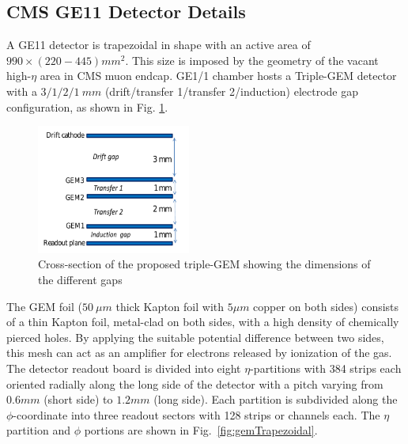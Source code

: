 \subsection{CMS GE11 Detector Details} %
\label{sub:ge11_detector_details}
 A GE11 detector is trapezoidal in shape with an active area of $990\times (220-445)mm^2$.
This size is imposed by the geometry of the vacant high-$\eta$ area in CMS muon endcap.
GE1/1 chamber hosts a Triple-GEM detector with a $3/1/2/1~mm$ (drift/transfer 1/transfer 2/induction) electrode gap configuration, as shown in Fig. \ref{fig:tripple-gem}.
\begin{figure}[!htbp]
    \begin{center}
        \includegraphics[width=0.45\textwidth]{figures/GEM/tripple-gem.png}
        \caption{Cross-section of the proposed triple-GEM showing the dimensions of the different gaps}
        \label{fig:tripple-gem}
    \end{center}
\end{figure} 
The GEM foil ($50~\mu m$ thick Kapton foil with $5\mu m$ copper on both sides) consists of a thin Kapton foil, metal-clad on both sides, with a high density of chemically pierced holes.
By applying the suitable potential difference between two sides, this mesh can act as an amplifier for electrons released by ionization of the gas.
The detector readout board is divided into eight $\eta$-partitions with 384 strips each oriented radially along the long side of the detector with a pitch varying from $0.6mm$ (short side) to $1.2mm$ (long side).
Each partition is subdivided along the $\phi$-coordinate into three readout sectors with 128 strips or channels each. The $\eta$ partition and $\phi$ portions are shown in Fig.~\ref{fig:gemTrapezoidal}.
